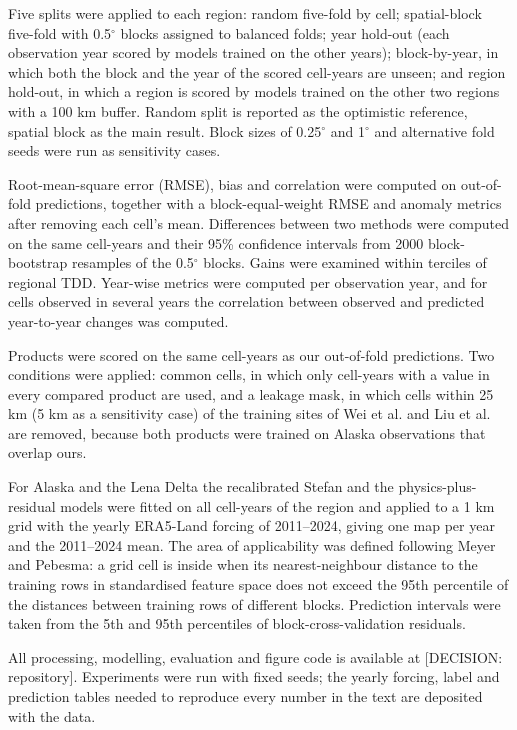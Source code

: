 Five splits were applied to each region\cite{Roberts2017,Ploton2020}: random five-fold by cell; spatial-block five-fold with 0.5$^\circ$ blocks assigned to balanced folds; year hold-out (each observation year scored by models trained on the other years); block-by-year, in which both the block and the year of the scored cell-years are unseen; and region hold-out, in which a region is scored by models trained on the other two regions with a 100 km buffer. Random split is reported as the optimistic reference, spatial block as the main result. Block sizes of 0.25$^\circ$ and 1$^\circ$ and alternative fold seeds were run as sensitivity cases.

Root-mean-square error (RMSE), bias and correlation were computed on out-of-fold predictions, together with a block-equal-weight RMSE and anomaly metrics after removing each cell's mean. Differences between two methods were computed on the same cell-years and their 95\% confidence intervals from 2000 block-bootstrap resamples of the 0.5$^\circ$ blocks. Gains were examined within terciles of regional TDD. Year-wise metrics were computed per observation year, and for cells observed in several years the correlation between observed and predicted year-to-year changes was computed.

Products were scored on the same cell-years as our out-of-fold predictions. Two conditions were applied: common cells, in which only cell-years with a value in every compared product are used, and a leakage mask, in which cells within 25 km (5 km as a sensitivity case) of the training sites of Wei et al. and Liu et al. are removed, because both products were trained on Alaska observations that overlap ours.

For Alaska and the Lena Delta the recalibrated Stefan and the physics-plus-residual models were fitted on all cell-years of the region and applied to a 1 km grid with the yearly ERA5-Land forcing of 2011--2024, giving one map per year and the 2011--2024 mean. The area of applicability was defined following Meyer and Pebesma\cite{MeyerPebesma2022}: a grid cell is inside when its nearest-neighbour distance to the training rows in standardised feature space does not exceed the 95th percentile of the distances between training rows of different blocks. Prediction intervals were taken from the 5th and 95th percentiles of block-cross-validation residuals.

All processing, modelling, evaluation and figure code is available at [DECISION: repository]. Experiments were run with fixed seeds; the yearly forcing, label and prediction tables needed to reproduce every number in the text are deposited with the data.
